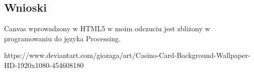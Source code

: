 \documentclass[a4paper,11pt,titlepage]{article}
\begin{document}
\subsection{Wnioski}
Canvas wprowadzony w HTML5 w moim odczuciu jest zbliżony w programowaniu do języka Processing.


\newpage
{}
\listoffigures
\newpage

\begin{thebibliography}{9}
https://www.deviantart.com/giozaga/art/Casino-Card-Background-Wallpaper-HD-1920x1080-454608180


\end{thebibliography}
\end{document}

